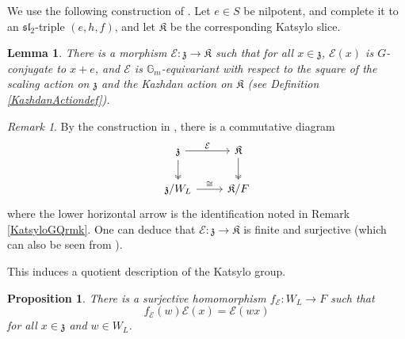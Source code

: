 \documentclass{amsart}
\newtheorem{lemma}[theorem]{Lemma}
\newtheorem{proposition}[theorem]{Proposition}
\theoremstyle{remark}
\newtheorem{remark}[theorem]{Remark}
\numberwithin{theorem}{section}
\numberwithin{equation}{section}
\begin{document}
We use the following construction of \cite{Katsylo}. Let $e \in S$ be nilpotent, and complete it to an $\mathfrak{sl}_2$-triple $(e,h,f)$, and let $\mathfrak{K}$ be the corresponding Katsylo slice.

\begin{lemma}\label{KatsyloMorphismlem}\cite[Lemma 5.1]{Katsylo}
    There is a morphism $\mathcal E:\mathfrak{z} \rightarrow \mathfrak{K}$ such that for all $x \in \mathfrak{z}$, $\mathcal E(x)$ is $G$-conjugate to $x+e$, and $\mathcal E$ is $\mathbb{G}_m$-equivariant with respect to the square of the scaling action on $\mathfrak{z}$ and the Kazhdan action on $\mathfrak{K}$ (see Definition \ref{KazhdanActiondef}).
\end{lemma}

\begin{remark}
    By the construction in \cite[Section 5]{Borho2}, there is a commutative diagram
    \begin{equation}\label{KMPropseqn}
        \begin{tikzcd}
            \mathfrak{z} \arrow[r, "\mathcal E"] \arrow[d, two heads] & \mathfrak{K} \arrow[d, two heads] \\
            \mathfrak{z}/W_L \arrow[r, "\cong"]                       & \mathfrak{K}/F                   
        \end{tikzcd}
    \end{equation}
    where the lower horizontal arrow is the identification noted in Remark \ref{KatsyloGQrmk}. One can deduce that $\mathcal E:\mathfrak{z} \rightarrow \mathfrak{K}$ is finite and surjective (which can also be seen from \cite[Section 6]{Katsylo}).
\end{remark}

This induces a quotient description of the Katsylo group.

\begin{proposition}\label{KatsyloGpWeylGpprp}
    There is a surjective homomorphism $f_{\mathcal E}:W_L \rightarrow F$ such that 
    \begin{equation}\label{KatsyloGpWeylGp1eqn}
        f_{\mathcal E}(w)\mathcal E(x) = \mathcal E(wx)
    \end{equation}
    for all $x \in \mathfrak{z}$ and $w \in W_L$.
\end{proposition}
\end{document}
